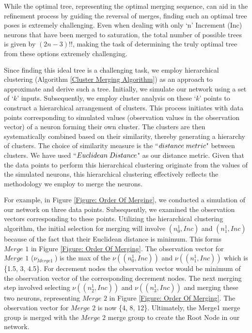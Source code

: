 While the optimal tree, representing the optimal merging sequence, can aid in the refinement process by guiding the reversal of merges, finding such an optimal tree poses is extremely challenging. Even when dealing with only `n' Increment (Inc) neurons that have been merged to saturation, the total number of possible trees is given by $(2n-3)!!$, making the task of determining the truly optimal tree from these options extremely challenging.

Since finding this ideal tree is a challenging task, we employ hierarchical clustering (Algorithm \ref{Cluster Merging Algorithm}) as an approach to approximate and derive such a tree. Initially, we simulate our network using a set of `$k$' inputs. Subsequently, we employ cluster analysis on these `$k$' points to construct a hierarchical arrangement of clusters. This process initiates with data points corresponding to simulated values (observation values in the observation vector) of a neuron  forming their own cluster. The clusters are then systematically combined based on their similarity, thereby generating a hierarchy of clusters. The choice of similarity measure is the ``$distance \hspace{1mm} metric$" between clusters. We have used ``$Euclidean \hspace{1mm} Distance$" as our distance metric. Given that the data points to perform this hierarchical clustering originate from the values of the simulated neurons, this hierarchical clustering effectively reflects the methodology we employ to merge the neurons.

For example, in Figure \ref{Figure: Order Of Merging}, we conducted a simulation of our network on three data points. Subsequently, we examined the observation vectors corresponding to these points. Utilizing the hierarchical clustering algorithm, the initial selection for merging  will involve $(n_0^{1}, Inc)$ and $(n_1^{1}, Inc)$ because of the fact that their Euclidean distance is minimum. This forms $\textit{Merge 1}$ in Figure \ref{Figure: Order Of Merging}. The observation vector for $\textit{Merge 1}$ ($\nu_\textit{Merge1 }$) is the max of the $\nu((n_0^{1}, Inc))$ and $\nu((n_1^{1},Inc))$ which is \{1.5, 3, 4.5\}. For decrement nodes the observation vector would be minimum of the observation vector of the corresponding decrement nodes. The next merging step involved selecting $\nu((n_2^{1}, Inc))$ and $\nu((n_3^{1}, Inc))$ and merging these two neurons, representing $\textit{Merge 2}$ in Figure \ref{Figure: Order Of Merging}. The observation vector for $\textit{Merge 2}$ is now \{4, 8, 12\}. Ultimately, the Merge1 merge group is merged with the $\textit{Merge 2}$ merge group to create the Root Node in our network.

